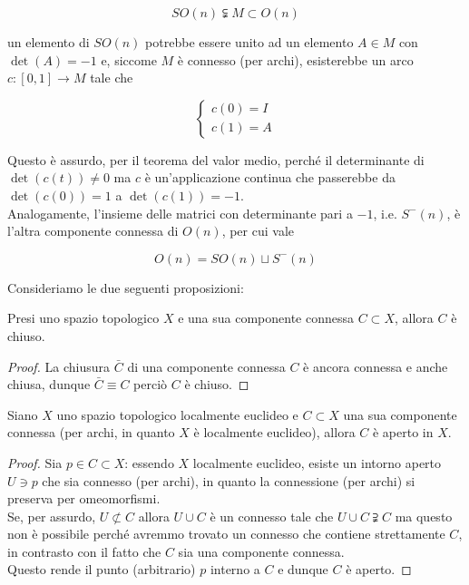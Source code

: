 \begin{equation}
	SO(n) \subsetneqq M \subset O(n)
\end{equation}

un elemento di $ SO(n) $ potrebbe essere unito ad un elemento $ A \in M $ con $ \det(A) = -1 $ e, siccome $ M $ è connesso (per archi), esisterebbe un arco $ c : [0,1] \to M $ tale che

\begin{equation}
	\begin{cases}
		c(0) = I\\
		c(1) = A
	\end{cases}
\end{equation}

Questo è assurdo, per il teorema del valor medio, perché il determinante di $ \det(c(t)) \neq 0 $ ma $ c $ è un'applicazione continua che passerebbe da $ \det(c(0)) = 1 $ a $ \det(c(1)) = -1 $.\\
Analogamente, l'insieme delle matrici con determinante pari a $ -1 $, i.e. $ S^{-}(n) $, è l'altra componente connessa di $ O(n) $, per cui vale

\begin{equation}
	O(n) = SO(n) \sqcup S^{-}(n)
\end{equation}

Consideriamo le due seguenti proposizioni:

\begin{definition}
	Presi uno spazio topologico $ X $ e una sua componente connessa $ C \subset X $, allora $ C $ è chiuso.
\end{definition}

\begin{proof}
	La chiusura $ \bar{C} $ di una componente connessa $ C $ è ancora connessa e anche chiusa, dunque $ \bar{C} \equiv C $ perciò $ C $ è chiuso.
\end{proof}

\begin{definition}
	Siano $ X $ uno spazio topologico localmente euclideo e $ C \subset X $ una sua componente connessa (per archi, in quanto $ X $ è localmente euclideo), allora $ C $ è aperto in $ X $.
\end{definition}

\begin{proof}
	Sia $ p \in C \subset X $: essendo $ X $ localmente euclideo, esiste un intorno aperto $ U \ni p $ che sia connesso (per archi), in quanto la connessione (per archi) si preserva per omeomorfismi.\\
	Se, per assurdo, $ U \not\subset C $ allora $ U \cup C $ è un connesso tale che $ U \cup C \supsetneqq C $ ma questo non è possibile perché avremmo trovato un connesso che contiene strettamente $ C $, in contrasto con il fatto che $ C $ sia una componente connessa.\\
	Questo rende il punto (arbitrario) $ p $ interno a $ C $ e dunque $ C $ è aperto.
\end{proof}

